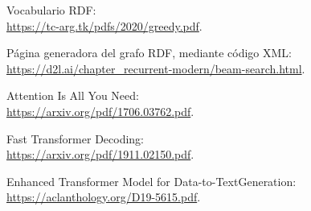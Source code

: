 \documentclass[10pt,twocolumn]{article}
\theoremstyle{definition}
\begin{document}
\vspace{0.2cm}

\begin{thebibliography}{00}

 Vocabulario RDF:\\ \href{https://tc-arg.tk/pdfs/2020/greedy.pdf}{https://tc-arg.tk/pdfs/2020/greedy.pdf}. 

 P\'agina generadora del grafo RDF, mediante c\'odigo XML: \href{https://d2l.ai/chapter_recurrent-modern/beam-search.html}{https://d2l.ai/chapter_recurrent-modern/beam-search.html}.

 Attention  Is  All  You  Need:\\ \href{https://arxiv.org/pdf/1706.03762.pdf}{https://arxiv.org/pdf/1706.03762.pdf}. 

 Fast  Transformer  Decoding:\\ \href{https://arxiv.org/pdf/1911.02150.pdf}{https://arxiv.org/pdf/1911.02150.pdf}. 

 Enhanced  Transformer  Model  for  Data-to-TextGeneration:\\ \href{https://aclanthology.org/D19-5615.pdf}{https://aclanthology.org/D19-5615.pdf}. 


\end{thebibliography}
\end{document}
